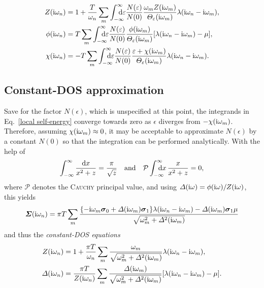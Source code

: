 \begin{subequations} \label{local Eliashberg equations}
   \begin{align}
      Z(\I \omega_n) &= 1 + \frac T {\omega_n} \sum_m
      \int \from{-\infty} \till \infty \D \epsilon \frac{N(\epsilon)}{N(0)}
      \frac{\omega_m Z (\I \omega_m)}{\Theta_\epsilon(\I \omega_m)}
      \lambda(\I \omega_n - \I \omega_m),
      \\
      \phi(\I \omega_n) &= T \sum_m
      \int \from{-\infty} \till \infty \D \epsilon \frac{N(\epsilon)}{N(0)}
      \frac{\phi(\I \omega_m)}{\Theta_\epsilon(\I \omega_m)}
      [\lambda(\I \omega_n - \I \omega_m) - \mu],
      \\
      \chi(\I \omega_n) &= -T \sum_m
      \int \from{-\infty} \till \infty \D \epsilon \frac{N(\epsilon)}{N(0)}
      \frac{\epsilon + \chi(\I \omega_m)}{\Theta_\epsilon(\I \omega_m)}
      \lambda(\I \omega_n - \I \omega_m).
   \end{align}
\end{subequations}

\subsection{Constant-DOS approximation}

Save for the factor $N(\epsilon)$, which is unspecified at this point, the
integrands in Eq.~\ref{local self-energy} converge towards zero as $\epsilon$
diverges from $-\chi(\mathrm i \omega_m)$. Therefore, assuming $\chi(\mathrm i \omega_m)
\approx 0$, it may be acceptable to approximate $N(\epsilon)$ by a constant
$N(0)$ so that the integration can be performed analytically. With the help of
%
\begin{equation} \label{integrals}
    \int_{-\infty}^\infty \frac{\D x}{x^2 + z} = \frac \pi {\sqrt z}
    \quad \text{and} \quad
    \mathcal P \int \from{-\infty} \till \infty \D x \, \frac x {x^2 + z} = 0,
\end{equation}
%
where $\mathcal P$ denotes the \textsc{Cauchy} principal value, and using
$\varDelta(\mathrm i \omega) = \phi(\mathrm i \omega) / Z(\mathrm i \omega)$, this yields
%
\begin{equation*}
    \boldsymbol {\varSigma}(\mathrm i \omega_n)
    = \pi T \sum_m \frac{ \{
        - \mathrm i \omega_m \boldsymbol \sigma_0
        + \varDelta(\mathrm i \omega_m) \boldsymbol \sigma_1 \}
        \lambda(\mathrm i \omega_n - \mathrm i \omega_m)
        - \varDelta(\mathrm i \omega_m) \boldsymbol \sigma_1 \mu }
        { \sqrt{\omega_m^2 + \varDelta^2(\mathrm i \omega_m)} }
\end{equation*}
%
and thus the \emph{constant-DOS  equations}
%
\begin{subequations}
    \begin{align}
        Z(\mathrm i \omega_n) &= 1 + \frac{\pi T}{\omega_n} \sum_m
        \frac{\omega_m}{\sqrt{\omega_m^2 + \varDelta^2(\mathrm i \omega_m)}}
        \lambda(\mathrm i \omega_n - \mathrm i \omega_m),
        \\
        \varDelta(\mathrm i \omega_n) &= \frac{\pi T}{Z(\mathrm i \omega_n)} \sum_m
        \frac{\varDelta(\mathrm i \omega_m)}{\sqrt{\omega_m^2 + \varDelta^2(\mathrm i \omega_m)}}
        [\lambda(\mathrm i \omega_n - \mathrm i \omega_m) - \mu].
    \end{align}
\end{subequations}

